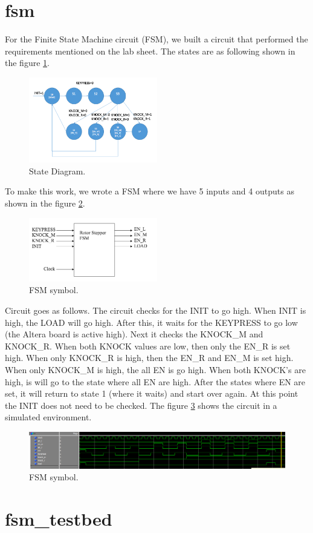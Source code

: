 \documentclass[10pt]{article}
\begin{document}
\section{fsm}
For the Finite State Machine circuit (FSM), we built a circuit that performed the requirements mentioned on the lab sheet. The states are as following shown in the figure \ref{fig:state_diagram}.
\begin{figure}[!htb]
    \centering
    \includegraphics[width=0.5\textwidth]{./state_diagram.png}
    \caption{State Diagram.}
    \label{fig:state_diagram}
\end{figure}
To make this work, we wrote a FSM where we have 5 inputs and 4 outputs as shown in the figure \ref{fig:FSM}.
\begin{figure}[!htb]
    \centering
    \includegraphics[width=0.5\textwidth]{./FSM.png}
    \caption{FSM symbol.}
    \label{fig:FSM}
\end{figure}
Circuit goes as follows. The circuit checks for the INIT to go high. When INIT is high, the LOAD will go high. After this, it waits for the KEYPRESS to go low (the Altera board is active high). Next it checks the KNOCK\_M and KNOCK\_R. When both KNOCK values are low, then only the EN\_R is set high. When only KNOCK\_R is high, then the EN\_R and EN\_M is set high. When only KNOCK\_M is high, the all EN is go high. When both KNOCK's are high, is will go to the state where all EN are high. After the states where EN are set, it will return to state 1 (where it waits) and start over again. At this point the INIT does not need to be checked. The figure \ref{fig:fsm_test} shows the circuit in a simulated environment.
\begin{figure}[!htb]
    \centering
    \includegraphics[width=1\textwidth]{./fsm_test.png}
    \caption{FSM symbol.}
    \label{fig:fsm_test}
\end{figure}


\section{fsm\_testbed}
\end{document}
